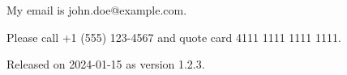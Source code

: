 \documentclass[11pt,a4paper]{article}
\begin{document}
My email is john.doe@example.com.

Please call +1 (555) 123-4567 and quote card 4111 1111 1111 1111.

Released on 2024-01-15 as version 1.2.3.
\end{document}
